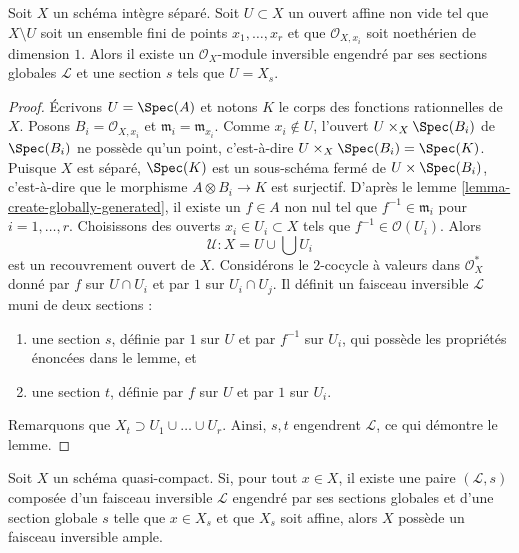 \begin{lemma}
\label{lemma-find-globally-generated}
Soit $X$ un schéma intègre séparé. Soit $U \subset X$ un ouvert affine non vide
tel que $X \setminus U$ soit un ensemble fini de points
$x_1, \ldots, x_r$ et que $\mathcal{O}_{X, x_i}$ soit noethérien de dimension $1$.
Alors il existe un $\mathcal{O}_X$-module inversible engendré par ses sections globales
$\mathcal{L}$ et une section $s$ tels que $U = X_s$.
\end{lemma}

\begin{proof}
Écrivons $U = \Spec(A)$ et notons $K$ le corps des fonctions rationnelles de $X$.
Posons $B_i = \mathcal{O}_{X, x_i}$ et $\mathfrak m_i = \mathfrak m_{x_i}$.
Comme $x_i \not \in U$, l'ouvert
$U \times_X \Spec(B_i)$ de $\Spec(B_i)$ ne possède qu'un point, c'est-à-dire
$U \times_X \Spec(B_i) = \Spec(K)$.
Puisque $X$ est séparé, $\Spec(K)$ est un sous-schéma fermé
de $U \times \Spec(B_i)$, c'est-à-dire que le morphisme $A \otimes B_i \to K$ est surjectif.
D'après le lemme \ref{lemma-create-globally-generated}, il existe un
$f \in A$ non nul tel que $f^{-1} \in \mathfrak m_i$ pour $i = 1, \ldots, r$.
Choisissons des ouverts $x_i \in U_i \subset X$ tels que $f^{-1} \in \mathcal{O}(U_i)$.
Alors
$$
\mathcal{U} : X = U \cup \bigcup U_i
$$
est un recouvrement ouvert de $X$. Considérons le $2$-cocycle à valeurs
dans $\mathcal{O}_X^*$ donné par $f$ sur $U \cap U_i$ et par
$1$ sur $U_i \cap U_j$. Il définit un faisceau inversible $\mathcal{L}$
muni de deux sections :
\begin{enumerate}
\item une section $s$, définie par $1$ sur $U$
et par $f^{-1}$ sur $U_i$, qui possède les propriétés énoncées dans le lemme, et
\item une section $t$, définie par $f$ sur $U$ et
par $1$ sur $U_i$.
\end{enumerate}
Remarquons que $X_t \supset U_1 \cup \ldots \cup U_r$.
Ainsi, $s, t$ engendrent $\mathcal{L}$, ce qui démontre le lemme.
\end{proof}

\begin{lemma}
\label{lemma-enough-globally-generated-ample}
Soit $X$ un schéma quasi-compact. Si, pour tout $x \in X$,
il existe une paire $(\mathcal{L}, s)$ composée d'un faisceau inversible
$\mathcal{L}$ engendré par ses sections globales et d'une section globale $s$ telle que
$x \in X_s$ et que $X_s$ soit affine, alors $X$ possède un faisceau inversible
ample.
\end{lemma}

